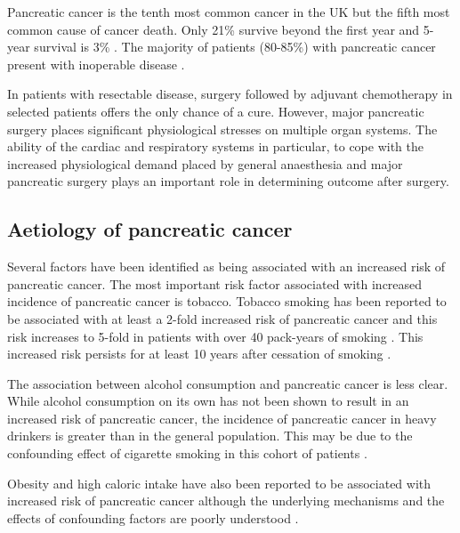 Pancreatic cancer is the tenth most common cancer in the UK but the fifth most common cause of cancer death. 
Only 21\% survive beyond the first year and 5-year survival is 3\% \parencite{cancerresearchuk_cancer_2011}. 
The majority of patients (80-85\%) with pancreatic cancer present with inoperable disease \parencite{cancerresearchuk_cancer_2011,sener_pancreatic_1999}. 

In patients with resectable disease, surgery \parencite{sener_pancreatic_1999, sohn_resected_2000,geer_prognostic_1993} followed by adjuvant chemotherapy in selected patients \parencite{neoptolemos_randomized_2004, neoptolemos_adjuvant_2009} offers the only chance of a cure. 
However, major pancreatic surgery places significant physiological stresses on multiple organ systems. 
The ability of the cardiac and respiratory systems in particular, to cope with the increased physiological demand placed by general anaesthesia and major pancreatic surgery plays an important role in determining outcome after surgery.

\subsection{Aetiology of pancreatic cancer}
Several factors have been identified as being associated with an increased risk of pancreatic cancer.
The most important risk factor associated with increased incidence of pancreatic cancer is tobacco. 
Tobacco smoking has been reported to be associated with at least a 2-fold increased risk of pancreatic cancer and this risk increases to 5-fold in patients with over 40 pack-years of smoking \parencite{raimondi_early_2007, iodice_tobacco_2008}. 
This increased risk persists for at least 10 years after cessation of smoking \parencite{iodice_tobacco_2008}.

The association between alcohol consumption and pancreatic cancer is less clear. 
While alcohol consumption on its own has not been shown to result in an increased risk of pancreatic cancer, the incidence of pancreatic cancer in heavy drinkers is greater than in the general population.
This may be due to the confounding effect of cigarette smoking in this cohort of patients \parencite{jiao_alcohol_2009, rohrmann_ethanol_2009}.

Obesity and high caloric intake have also been reported to be associated with increased risk of pancreatic cancer although the underlying mechanisms and the effects of confounding factors are poorly understood \parencite{berrington_de_gonzalez_meta-analysis_2003, larsson_body_2007, li_body_2009}. 

